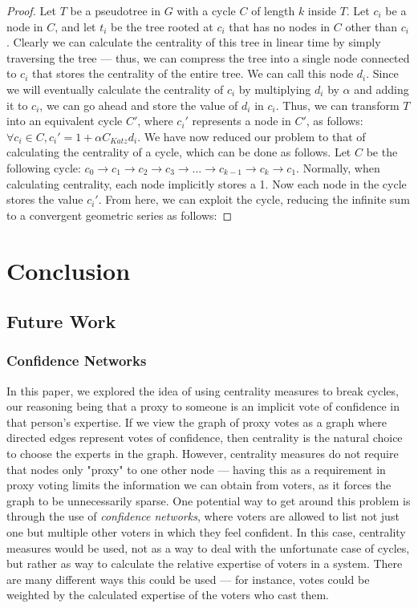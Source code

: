 \documentclass[10pt]{article}
\theoremstyle{definition}
\begin{document}
\begin{proof}
Let $T$ be a pseudotree in $G$ with a cycle $C$ of length $k$ inside $T$. Let $c_i$ be a node in $C$, and let $t_i$ be the tree rooted at  $c_i$ that has no nodes in $C$ other than $c_i$. Clearly we can calculate the centrality of this tree in linear time by simply traversing the tree --- thus, we can compress the tree into a single node connected to $c_i$ that stores the centrality of the entire tree. We can call this node $d_i$. Since we will eventually calculate the centrality of $c_i$ by multiplying $d_i$ by $\alpha$ and adding it to $c_i$, we can go ahead and store the value of $d_i$ in $c_i$. Thus, we can transform $T$ into an equivalent cycle $C'$, where $c_i'$ represents a node in $C'$, as follows: $\forall c_i \in C, c_i' = 1 + \alpha C_{Katz}d_i$.  We have now reduced our problem to that of calculating the centrality of a cycle, which can be done as follows. Let $C$ be the following cycle: $c_0 \rightarrow c_1 \rightarrow c_2 \rightarrow c_3 \rightarrow ... \rightarrow c_{k-1} \rightarrow c_k \rightarrow c_1$.  Normally, when calculating centrality, each node implicitly stores a 1. Now each node in the cycle stores the value $c_i'$. From here, we can exploit the cycle, reducing the infinite sum to a convergent geometric series as follows:
\end{proof}



\section{Conclusion}

\subsection{Future Work}
\subsubsection{Confidence Networks}

In this paper, we explored the idea of using centrality measures to break cycles, our reasoning being that a proxy to someone is an implicit vote of confidence in that person's expertise. If we view the graph of proxy votes as a graph where directed edges represent votes of confidence, then centrality is the natural choice to choose the experts in the graph. However, centrality measures do not require that nodes only "proxy" to one other node --- having this as a requirement in proxy voting limits the information we can obtain from voters, as it forces the graph to be unnecessarily sparse. One potential way to get around this problem is through the use of \textit{confidence networks}, where voters are allowed to list not just one but multiple other voters in which they feel confident. In this case, centrality measures would be used, not as a way to deal with the unfortunate case of cycles, but rather as way to calculate the relative expertise of voters in a system. There are many different ways this could be used --- for instance, votes could be weighted by the calculated expertise of the voters who cast them.
\end{document}
